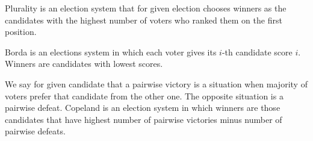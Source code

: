 \begin{exmp}[Plurality]
Plurality is an election system that for given election chooses winners as the candidates
with the highest number of voters who ranked them on the first position.
\end{exmp}

\begin{exmp}[Borda]
Borda is an elections system in which each voter gives its $i$-th candidate score $i$.
Winners are candidates with lowest scores.
\end{exmp}

\begin{exmp}[Copeland]
We say for given candidate that a pairwise victory is a situation
when majority of voters prefer that candidate from the other one.
The opposite situation is a pairwise defeat.
Copeland is an election system in which winners are those candidates that have
highest number of pairwise victories minus number of pairwise defeats.
\end{exmp}
